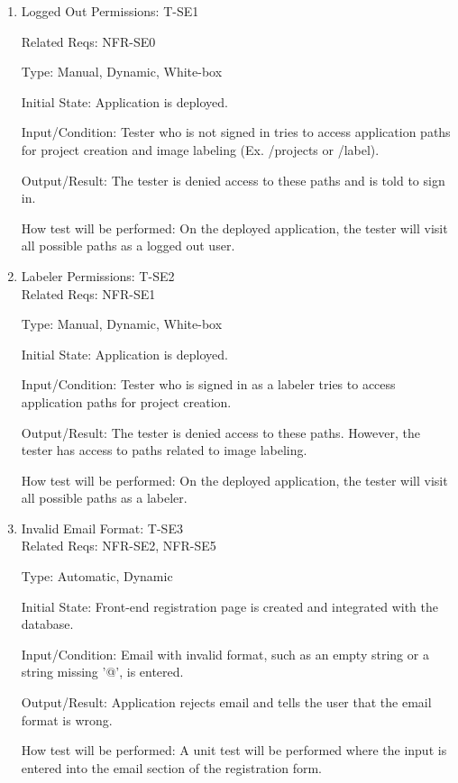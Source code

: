 \documentclass[12pt, titlepage]{article}
\begin{document}
\begin{enumerate}

\item{Logged Out Permissions: T-SE1\\}

Related Reqs: NFR-SE0

Type: Manual, Dynamic, White-box
					
Initial State: Application is deployed.
					
Input/Condition: Tester who is not signed in tries to access application paths for project creation and image labeling (Ex. /projects or /label).
					
Output/Result: The tester is denied access to these paths and is told to sign in.
					
How test will be performed: On the deployed application, the tester will visit all possible paths as a logged out user.

\item{Labeler Permissions: T-SE2\\}
Related Reqs: NFR-SE1

Type: Manual, Dynamic, White-box
					
Initial State: Application is deployed.
					
Input/Condition: Tester who is signed in as a labeler tries to access application paths for project creation.
					
Output/Result: The tester is denied access to these paths. However, the tester has access to paths related to image labeling.
					
How test will be performed: On the deployed application, the tester will visit all possible paths as a labeler.

\item{Invalid Email Format: T-SE3\\}
Related Reqs: NFR-SE2, NFR-SE5

Type: Automatic, Dynamic
					
Initial State: Front-end registration page is created and integrated with the database.
					
Input/Condition: Email with invalid format, such as an empty string or a string missing '@', is entered.
					
Output/Result: Application rejects email and tells the user that the email format is wrong.
					
How test will be performed: A unit test will be performed where the input is entered into the email section of the registration form.


\end{enumerate}
\end{document}
